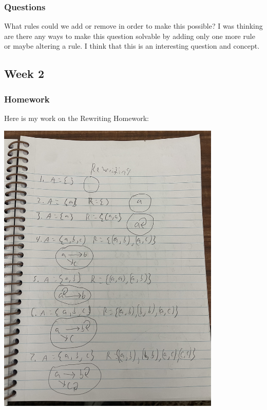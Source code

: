 \documentclass{article}
\theoremstyle{theorem}
\theoremstyle{definition}
\theoremstyle{remark}
\begin{document}
\subsubsection{Questions}

What rules could we add or remove in order to make this possible? I was thinking are there any ways to make this question solvable
by adding only one more rule or maybe altering a rule. I think that this is an interesting question and concept.

\subsection{Week 2}

\subsubsection{Homework}

Here is my work on the Rewriting Homework:

\includegraphics[width=0.8\textwidth]{../img/IMG_2709.jpg}
\end{document}
